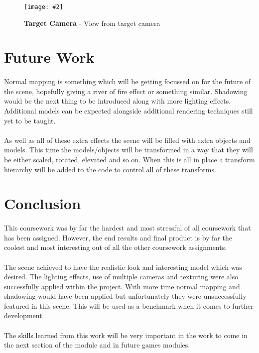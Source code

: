 \documentclass[10pt, a4paper]{article}
\newcommand{\figuremacro}[5]{
    \begin{figure}[#1]
        \centering
        \texttt{[image: \#2]}
        \caption[#3]{\textbf{#3}#4}
        \label{fig:#2}
    \end{figure}
}
\begin{document}
	\figuremacro{h}{target_camera}{Target Camera}{ - View from target camera}{1.0} 
    
	\section{Future Work}
    \paragraph{}
    Normal mapping is something which will be getting focussed on for the future of the scene, hopefully giving a river of fire effect or something similar. Shadowing would be the next thing to be introduced along with more lighting effects. Additional models can be expected alongside additional rendering techniques still yet to be taught.
    
    \paragraph{}
    As well as all of these extra effects the scene will be filled with extra objects and models. This time the models/objects will be transformed in a way that they will be either scaled, rotated, elevated and so on. When this is all in place a transform hierarchy will be added to the code to control all of these transforms.
	
	\section{Conclusion}	
	\paragraph{}
	This coursework was by far the hardest and most stressful of all coursework that has been assigned. However, the end results and final product is by far the coolest and most interesting out of all the other coursework assignments.
	
	\paragraph{}
	The scene achieved to have the realistic look and interesting model which was desired. The lighting effects, use of multiple cameras and texturing were also successfully applied within the project. With more time normal mapping and shadowing  would have been applied but unfortunately they were unsuccessfully featured in this scene. This will be used as a benchmark when it comes to further development.
	
	\paragraph{}
	The skills learned from this work will be very important in the work to come in the next section of the module and in future games modules.
		
	
\end{document}
